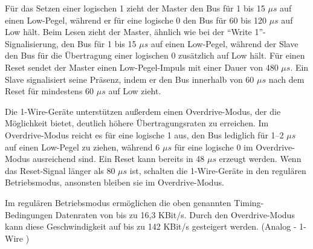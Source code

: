 Für das Setzen einer logischen 1 zieht der Master den Bus für 1 bis 15 \(\mu s\) auf einen Low-Pegel, während er für eine
logische 0 den Bus für 60 bis 120 \(\mu s\) auf Low hält. Beim Lesen zieht der Master, ähnlich wie bei der \enquote{Write 1}-Signalisierung,
den Bus für 1 bis 15 \(\mu s\) auf einen Low-Pegel, während der Slave den Bus für die Übertragung einer logischen 0 zusätzlich auf
Low hält. Für einen Reset sendet der Master einen Low-Pegel-Impuls mit einer Dauer von 480 \(\mu s\). Ein Slave signalisiert seine
Präsenz, indem er den Bus innerhalb von 60 \(\mu s\) nach dem Reset für mindestens 60 \(\mu s\) auf Low zieht.

Die 1-Wire-Geräte unterstützen außerdem einen Overdrive-Modus, der die Möglichkeit bietet, deutlich höhere Übertragungsraten
zu erreichen. Im Overdrive-Modus reicht es für eine logische 1 aus, den Bus lediglich für 1–2 \(\mu s\) auf einen Low-Pegel zu ziehen,
während 6 \(\mu s\) für eine logische 0 im Overdrive-Modus ausreichend sind. Ein Reset kann bereits in 48 \(\mu s\) erzeugt werden.
Wenn das Reset-Signal länger als 80 \(\mu s\) ist, schalten die 1-Wire-Geräte in den regulären Betriebsmodus, ansonsten bleiben
sie im Overdrive-Modus.

Im regulären Betriebsmodus ermöglichen die oben genannten Timing-Bedingungen Datenraten von bis zu 16,3 KBit/s.
Durch den Overdrive-Modus kann diese Geschwindigkeit auf bis zu 142 KBit/s gesteigert werden.
(Analog - 1-Wire \cite{1wire})

